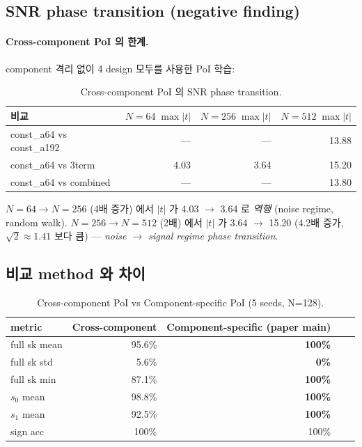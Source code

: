 \documentclass[11pt]{article}
\theoremstyle{plain}
\theoremstyle{definition}
\theoremstyle{remark}
\begin{document}
\subsection{SNR phase transition (negative finding)}

\paragraph{Cross-component PoI 의 한계.} component 격리 없이 4 design 모두를
사용한 PoI 학습:

\begin{table}[h!]
\centering
\caption{Cross-component PoI 의 SNR phase transition.}
\label{tab:snr-phase}
\small
\begin{tabular}{lrrr}
\toprule
비교 & $N=64\;\max|t|$ & $N=256\;\max|t|$ & $N=512\;\max|t|$ \\
\midrule
const\_a64 vs const\_a192 & — & — & 13.88 \\
const\_a64 vs 3term & 4.03 & 3.64 & 15.20 \\
const\_a64 vs combined & — & — & 13.80 \\
\bottomrule
\end{tabular}
\end{table}

$N=64 \to N=256$ (4배 증가) 에서 $|t|$ 가 4.03 $\to$ 3.64 로 \emph{역행}
(noise regime, random walk). $N=256 \to N=512$ (2배) 에서 $|t|$ 가
3.64 $\to$ 15.20 (4.2배 증가, $\sqrt{2} \approx 1.41$ 보다 큼) — \emph{noise
$\to$ signal regime phase transition}.

\subsection{비교 method 와 차이}

\begin{table}[h!]
\centering
\caption{Cross-component PoI vs Component-specific PoI (5 seeds, N=128).}
\label{tab:methods}
\small
\begin{tabular}{lrrrr}
\toprule
metric & Cross-component & \textbf{Component-specific (paper main)} \\
\midrule
full sk mean & 95.6\% & \textbf{100\%} \\
full sk std & 5.6\% & \textbf{0\%} \\
full sk min & 87.1\% & \textbf{100\%} \\
$s_0$ mean & 98.8\% & \textbf{100\%} \\
$s_1$ mean & 92.5\% & \textbf{100\%} \\
sign acc & 100\% & 100\% \\
\bottomrule
\end{tabular}
\end{table}
\end{document}
